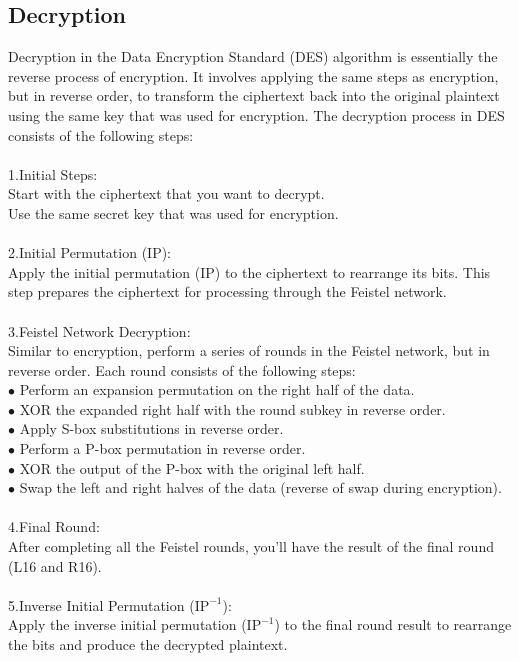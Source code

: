 \documentclass{report}
\begin{document}
\subsection{Decryption}
Decryption in the Data Encryption Standard (DES) algorithm is essentially the reverse process of encryption. It involves applying the same steps as encryption, but in reverse order, to transform the ciphertext back into the original plaintext using the same key that was used for encryption. The decryption process in DES consists of the following steps:\\
\\
1.Initial Steps:\\
Start with the ciphertext that you want to decrypt.\\
Use the same secret key that was used for encryption.\\
\\
2.Initial Permutation (IP):\\
Apply the initial permutation (IP) to the ciphertext to rearrange its bits. This step prepares the ciphertext for processing through the Feistel network.\\
\\
3.Feistel Network Decryption:\\
Similar to encryption, perform a series of rounds in the Feistel network, but in reverse order. Each round consists of the following steps:\\
$\bullet$ Perform an expansion permutation on the right half of the data.\\
$\bullet$ XOR the expanded right half with the round subkey in reverse order.\\
$\bullet$ Apply S-box substitutions in reverse order.\\
$\bullet$ Perform a P-box permutation in reverse order.\\
$\bullet$ XOR the output of the P-box with the original left half.\\
$\bullet$ Swap the left and right halves of the data (reverse of swap during encryption).\\
\\
4.Final Round:\\
After completing all the Feistel rounds, you'll have the result of the final round (L16 and R16).\\
\\
5.Inverse Initial Permutation ($\text{IP}^{-1}$):\\
Apply the inverse initial permutation ($\text{IP}^{-1}$) to the final round result to rearrange the bits and produce the decrypted plaintext.\\
\end{document}
